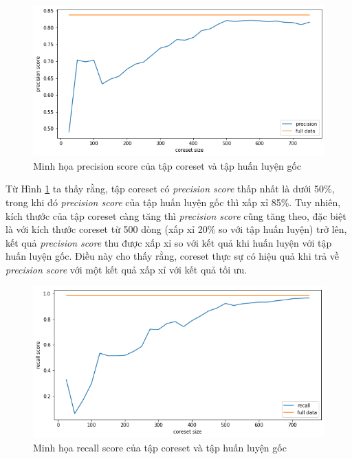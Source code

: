 \documentclass[a4paper, 12pt, oneside]{report}
\begin{document}
\begin{center}
    \begin{figure}[H]
    \begin{center}
     \includegraphics[scale=0.5]{precision_voice_gender.png}
    \end{center}
    \caption{Minh họa precision score của tập coreset và tập huấn luyện gốc}
    \label{Hình 4.3}
    \end{figure}
\end{center}
Từ Hình \ref{Hình 4.3} ta thấy rằng, tập coreset có \textit{precision score} thấp nhất là dưới 50\%, trong khi đó \textit{precision score} của tập huấn luyện gốc thì xấp xỉ 85\%. Tuy nhiên, kích thước của tập coreset càng tăng thì \textit{precision score} cũng tăng theo, đặc biệt là với kích thước coreset từ 500 dòng (xấp xỉ 20\% so với tập huấn luyện) trở lên, kết quả \textit{precision score} thu được xấp xỉ so với kết quả khi huấn luyện với tập huấn luyện gốc. Điều này cho thấy rằng, coreset thực sự có hiệu quả khi trả về \textit{precision score} với một kết quả xấp xỉ với kết quả tối ưu. 
\begin{center}
    \begin{figure}[H]
    \begin{center}
     \includegraphics[scale=0.5]{recall_voice_gender.png}
    \end{center}
    \caption{Minh họa recall score của tập coreset và tập huấn luyện gốc}
    \label{Hình 4.4}
    \end{figure}
\end{center}
\end{document}
